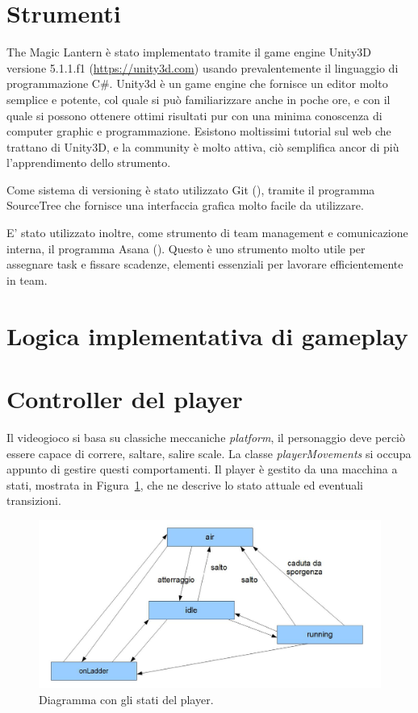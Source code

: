 \section{Strumenti}

The Magic Lantern è stato implementato tramite il game engine Unity3D versione 5.1.1.f1 (\url{https://unity3d.com}) usando prevalentemente il linguaggio di programmazione C\#. Unity3d è un game engine che fornisce un editor molto semplice e potente, col quale si può familiarizzare anche in poche ore, e con il quale si possono ottenere ottimi risultati pur con una minima conoscenza di computer graphic e programmazione. Esistono moltissimi tutorial sul web che trattano di Unity3D, e la community è molto attiva, ciò semplifica ancor di più l'apprendimento dello strumento.

Come sistema di versioning è stato utilizzato Git (\cite{github}), tramite il programma SourceTree che fornisce una interfaccia grafica molto facile da utilizzare.

E' stato utilizzato inoltre, come strumento di team management e comunicazione interna, il programma Asana (\cite{asana}). Questo è uno strumento molto utile per assegnare task e fissare scadenze, elementi essenziali per lavorare efficientemente in team.


\section{Logica implementativa di gameplay}

\section{Controller del player}
\label{sec:player_movements}

Il videogioco si basa su classiche meccaniche \textit{platform}, il personaggio deve perciò essere capace di correre, saltare, salire scale. La classe \textit{playerMovements} si occupa appunto di gestire questi comportamenti.
Il player è gestito da una macchina a stati, mostrata in Figura~\ref{fig:development_player_stati}, che ne descrive lo stato attuale ed eventuali transizioni.

\begin{figure}%
	\centering
	\includegraphics[width= 0.9\columnwidth]{images/development/player.jpg}
	\caption{Diagramma con gli stati del player.}
	\label{fig:development_player_stati}
\end{figure}

